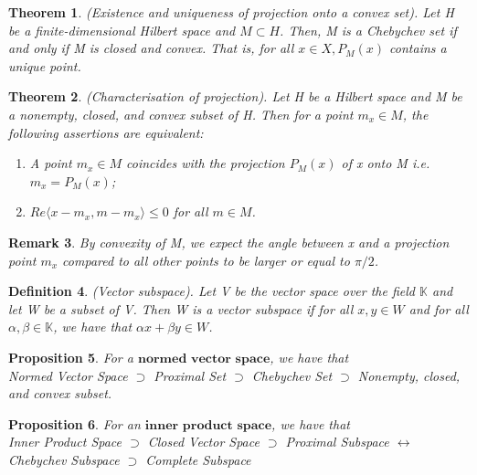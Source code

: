\documentclass[twoside]{article}
\newcounter{lecnum}
\newtheorem{theorem}{Theorem}[lecnum]
\newtheorem{proposition}[theorem]{Proposition}
\newtheorem{definition}[theorem]{Definition}
\newtheorem{remark}[theorem]{Remark}
\begin{document}
\begin{theorem}(Existence and uniqueness of projection onto a convex set). Let H be a finite-dimensional Hilbert space and $M \subset H$. Then, M is a Chebychev set if and only if M is closed and convex. That is, for all $x \in X, P_M(x)$ contains a unique point. 
\end{theorem}

\begin{theorem}(Characterisation of projection). Let H be a Hilbert space and M be a nonempty, closed, and convex subset of H. Then for a point $m_x \in M$, the following assertions are equivalent:
\begin{enumerate}
\item A point $m_x \in M$ coincides with the projection $P_M(x)$ of x onto M i.e. $m_x = P_M(x)$;
\item $Re\langle x - m_x, m - m_x \rangle \leq 0$ for all $m \in M$.
\end{enumerate}
\end{theorem}

\begin{remark}By convexity of M, we expect the angle between x and a projection point $m_x$ compared to all other points to be larger or equal to $\pi/2$.
\end{remark}

\begin{definition}(Vector subspace). Let V be the vector space over the field $\mathbb{K}$ and let W be a subset of V. Then W is a vector subspace if for all $x, y \in W$ and for all $\alpha, \beta \in \mathbb{K}$, we have that $\alpha x + \beta y \in W$.
\end{definition}

\begin{proposition}For a $\textbf{normed vector space}$, we have that \\

Normed Vector Space $\supset$ Proximal Set $\supset$ Chebychev Set $\supset$ Nonempty, closed, and convex subset.
\end{proposition}

\begin{proposition}For an $\textbf{inner product space}$, we have that \\

Inner Product Space $\supset$ Closed Vector Space $\supset$ Proximal Subspace $\leftrightarrow$  Chebychev Subspace $\supset$ Complete Subspace
\end{proposition}
\end{document}
